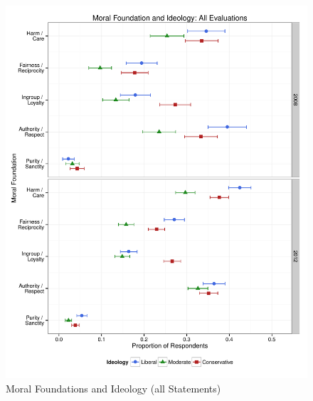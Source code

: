 \documentclass[12pt]{article}
\begin{document}
\begin{figure}\centering
\includegraphics[scale=.4]{../calc/fig/p1_mft_ideol.pdf}
\caption{Moral Foundations and Ideology (all Statements)}\label{fig:mft_ideol}
\end{figure}
\end{document}

